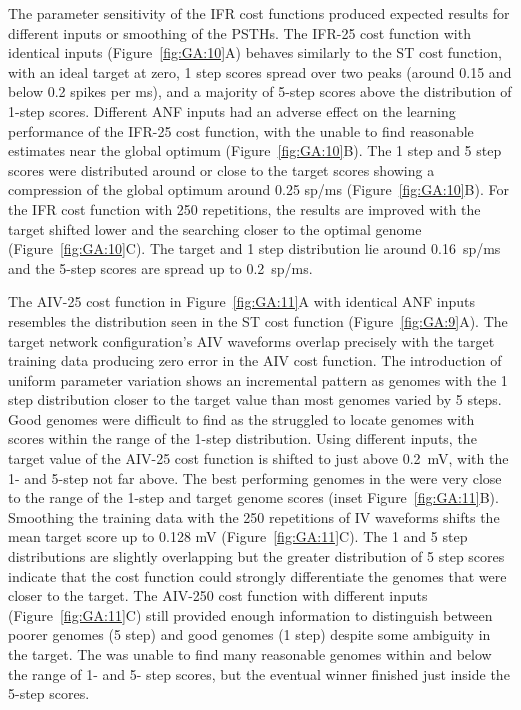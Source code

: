 \smallskip{}

The parameter sensitivity of the IFR cost functions produced expected
results for different {\ANF} inputs or smoothing of the PSTHs.  The
IFR-25 cost function with identical inputs (Figure~\ref{fig:GA:10}A) behaves similarly to the ST
cost function, with an ideal target at zero, 1 step scores spread over
two peaks (around 0.15 and below 0.2 spikes per ms), and a majority of
5-step scores above the distribution of 1-step scores.  Different ANF
inputs had an adverse effect on the learning performance of the IFR-25
cost function, with the {\GA} unable to find reasonable estimates near
the global optimum (Figure~\ref{fig:GA:10}B). The 1 step and 5 step scores were
distributed around or close to the target scores showing a compression
of the global optimum around 0.25 sp/ms (Figure~\ref{fig:GA:10}B).  For the IFR
cost function with 250 repetitions, the results are improved with the
target shifted lower and the {\GA} searching closer to the optimal
genome (Figure~\ref{fig:GA:10}C). The target and 1 step distribution lie around
0.16~sp/ms and the 5-step scores are spread up to 0.2~sp/ms.

\smallskip{}

The AIV-25 cost function in Figure~\ref{fig:GA:11}A with identical ANF
inputs resembles the distribution seen in the ST cost function
(Figure~\ref{fig:GA:9}A).  The target network configuration's AIV
waveforms overlap precisely with the target training data producing
zero error in the AIV cost function. The introduction of uniform
parameter variation shows an incremental pattern as genomes with the 1
step distribution closer to the target value than most genomes varied
by 5 steps.  Good genomes were difficult to find as the {\GA} struggled
to locate genomes with scores within the range of the 1-step
distribution. Using different inputs, the target value of the AIV-25
cost function is shifted to just above 0.2~mV, with the 1- and 5-step
not far above. The best performing genomes in the {\GA} were very close
to the range of the 1-step and target genome scores (inset
Figure~\ref{fig:GA:11}B). Smoothing the training data with the 250
repetitions of IV waveforms shifts the mean target score up to 0.128
mV (Figure~\ref{fig:GA:11}C).  The 1 and 5 step distributions are
slightly overlapping but the greater distribution of 5 step scores
indicate that the cost function could strongly differentiate the
genomes that were closer to the target.  The AIV-250 cost function
with different {\ANF} inputs (Figure~\ref{fig:GA:11}C) still provided
enough information to distinguish between poorer genomes (5 step) and
good genomes (1 step) despite some ambiguity in the target.  The {\GA}
was unable to find many reasonable genomes within and below the range
of 1- and 5- step scores, but the eventual winner finished just inside
the 5-step scores.


